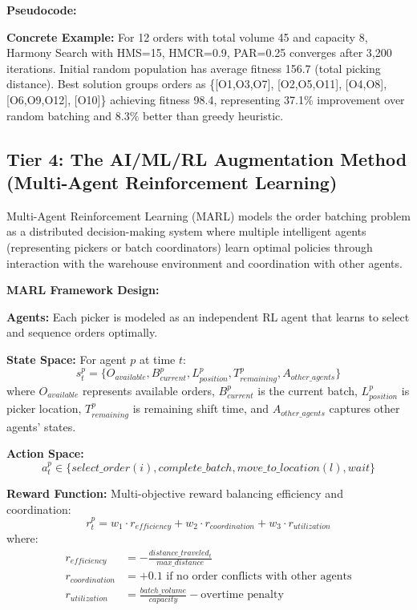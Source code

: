\documentclass{article}
\begin{document}
\textbf{Pseudocode:}


\textbf{Concrete Example:} For 12 orders with total volume 45 and capacity 8, Harmony Search with HMS=15, HMCR=0.9, PAR=0.25 converges after 3,200 iterations. Initial random population has average fitness 156.7 (total picking distance). Best solution groups orders as \{[O1,O3,O7], [O2,O5,O11], [O4,O8], [O6,O9,O12], [O10]\} achieving fitness 98.4, representing 37.1\% improvement over random batching and 8.3\% better than greedy heuristic.

\subsection{Tier 4: The AI/ML/RL Augmentation Method (Multi-Agent Reinforcement Learning)}

Multi-Agent Reinforcement Learning (MARL) models the order batching problem as a distributed decision-making system where multiple intelligent agents (representing pickers or batch coordinators) learn optimal policies through interaction with the warehouse environment and coordination with other agents.

\textbf{MARL Framework Design:}

\textbf{Agents:} Each picker is modeled as an independent RL agent that learns to select and sequence orders optimally.

\textbf{State Space:} For agent $p$ at time $t$:
\[
s_t^p = \{O_{available}, B_{current}^p, L_{position}^p, T_{remaining}^p, A_{other\_agents}\}
\]
where $O_{available}$ represents available orders, $B_{current}^p$ is the current batch, $L_{position}^p$ is picker location, $T_{remaining}^p$ is remaining shift time, and $A_{other\_agents}$ captures other agents' states.

\textbf{Action Space:} 
\[
a_t^p \in \{select\_order(i), complete\_batch, move\_to\_location(l), wait\}
\]

\textbf{Reward Function:} Multi-objective reward balancing efficiency and coordination:
\[
r_t^p = w_1 \cdot r_{efficiency} + w_2 \cdot r_{coordination} + w_3 \cdot r_{utilization}
\]
where:
\begin{align}
r_{efficiency} &= -\frac{distance\_traveled_t}{max\_distance} \\
r_{coordination} &= +0.1 \text{ if no order conflicts with other agents} \\
r_{utilization} &= \frac{batch\_volume}{capacity} - \text{overtime penalty}
\end{align}
\end{document}
